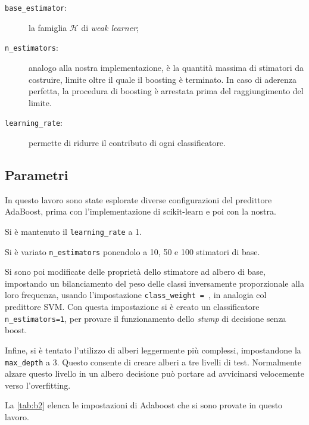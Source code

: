 \documentclass[12pt,a4paper,oneside,hidelinks]{report}
\begin{document}
\begin{description}
\item[\texttt{base\_estimator}:]la famiglia $ \mathcal{H} $ di \emph{weak learner};
\item[\texttt{n\_estimators}:]analogo alla nostra implementazione, è la quantità massima di stimatori da costruire, limite oltre il quale il boosting è terminato.
In caso di aderenza perfetta, la procedura di boosting è arrestata prima del raggiungimento del limite.
\item[\texttt{learning\_rate}:] permette di ridurre il contributo di ogni classificatore.

\end{description}
 
\subsection{Parametri}
In questo lavoro sono state esplorate diverse configurazioni del predittore AdaBoost, prima con l'implementazione di scikit-learn e poi con la nostra.

Si è mantenuto il \texttt{learning\_rate} a 1. 

Si è variato \texttt{n\_estimators} ponendolo a 10, 50 e 100 stimatori di base.

Si sono poi modificate delle proprietà dello stimatore ad albero di base, impostando un bilanciamento del peso delle classi inversamente proporzionale alla loro frequenza, usando l'impostazione \texttt{class\_weight = }, in analogia col predittore SVM. Con questa impostazione si è creato un classificatore \texttt{n\_estimators=1}, per provare il funzionamento dello \textit{stump} di decisione senza boost.

Infine, si è tentato l'utilizzo di alberi leggermente più complessi, impostandone la \texttt{max\_depth} a 3. Questo consente di creare alberi a tre livelli di test. Normalmente alzare questo livello in un albero decisione può portare ad avvicinarsi velocemente verso l'overfitting.

La \autoref{tab:b2} elenca le impostazioni di Adaboost che si sono provate in questo lavoro.
\end{document}
